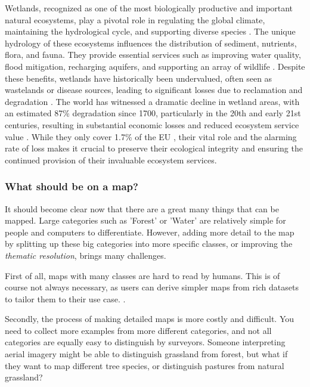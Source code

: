         Wetlands, recognized as one of the most biologically productive and important natural ecosystems, play a pivotal role in regulating the global climate, maintaining the hydrological cycle, and supporting diverse species \citep{hu2017global,ramsar2001wetlands}. The unique hydrology of these ecosystems influences the distribution of sediment, nutrients, flora, and fauna. They provide essential services such as improving water quality, flood mitigation, recharging aquifers, and supporting an array of wildlife \citep{costanza1997value,smardon2009sustaining}. Despite these benefits, wetlands have historically been undervalued, often seen as wastelands or disease sources, leading to significant losses due to reclamation and degradation \citep{giblett1996postmodern,owens2001global,davidson2014much,gardner2018global,dugan1993wetlands,oecd1996guidelines,ramsar2015wetlands}. The world has witnessed a dramatic decline in wetland areas, with an estimated 87\% degradation since 1700, particularly in the 20th and early 21st centuries, resulting in substantial economic losses and reduced ecosystem service value \citep{gardner2015state,costanza2014changes}. While they only cover 1.7\% of the EU \citep{eurostat2021land}, their vital role and the alarming rate of loss makes it crucial to preserve their ecological integrity and ensuring the continued provision of their invaluable ecosystem services.

    \subsubsection{What should be on a map?}

        It should become clear now that there are a great many things that can be mapped. Large categories such as 'Forest' or 'Water' are relatively simple for people and computers to differentiate. However, adding more detail to the map by splitting up these big categories into more specific classes, or improving the \textit{thematic resolution}, brings many challenges. 
        
        First of all, maps with many classes are hard to read by humans. This is of course not always necessary, as users can derive simpler maps from rich datasets to tailor them to their use case. \citep{tsendbazar2017integrating}. 

        Secondly, the process of making detailed maps is more costly and difficult. You need to collect more examples from more different categories, and not all categories are equally easy to distinguish by surveyors. Someone interpreting aerial imagery might be able to distinguish grassland from forest, but what if they want to map different tree species, or distinguish pastures from natural grassland?

